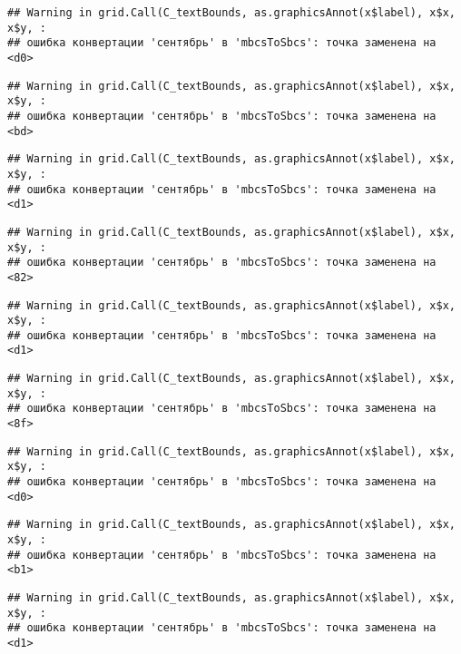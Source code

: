 \documentclass[
]{article}
\begin{document}
\begin{verbatim}
## Warning in grid.Call(C_textBounds, as.graphicsAnnot(x$label), x$x, x$y, :
## ошибка конвертации 'сентябрь' в 'mbcsToSbcs': точка заменена на <d0>
\end{verbatim}

\begin{verbatim}
## Warning in grid.Call(C_textBounds, as.graphicsAnnot(x$label), x$x, x$y, :
## ошибка конвертации 'сентябрь' в 'mbcsToSbcs': точка заменена на <bd>
\end{verbatim}

\begin{verbatim}
## Warning in grid.Call(C_textBounds, as.graphicsAnnot(x$label), x$x, x$y, :
## ошибка конвертации 'сентябрь' в 'mbcsToSbcs': точка заменена на <d1>
\end{verbatim}

\begin{verbatim}
## Warning in grid.Call(C_textBounds, as.graphicsAnnot(x$label), x$x, x$y, :
## ошибка конвертации 'сентябрь' в 'mbcsToSbcs': точка заменена на <82>
\end{verbatim}

\begin{verbatim}
## Warning in grid.Call(C_textBounds, as.graphicsAnnot(x$label), x$x, x$y, :
## ошибка конвертации 'сентябрь' в 'mbcsToSbcs': точка заменена на <d1>
\end{verbatim}

\begin{verbatim}
## Warning in grid.Call(C_textBounds, as.graphicsAnnot(x$label), x$x, x$y, :
## ошибка конвертации 'сентябрь' в 'mbcsToSbcs': точка заменена на <8f>
\end{verbatim}

\begin{verbatim}
## Warning in grid.Call(C_textBounds, as.graphicsAnnot(x$label), x$x, x$y, :
## ошибка конвертации 'сентябрь' в 'mbcsToSbcs': точка заменена на <d0>
\end{verbatim}

\begin{verbatim}
## Warning in grid.Call(C_textBounds, as.graphicsAnnot(x$label), x$x, x$y, :
## ошибка конвертации 'сентябрь' в 'mbcsToSbcs': точка заменена на <b1>
\end{verbatim}

\begin{verbatim}
## Warning in grid.Call(C_textBounds, as.graphicsAnnot(x$label), x$x, x$y, :
## ошибка конвертации 'сентябрь' в 'mbcsToSbcs': точка заменена на <d1>
\end{verbatim}
\end{document}
